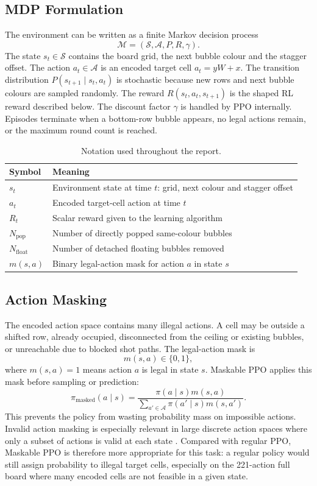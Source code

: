 \documentclass[10pt,a4paper]{article}
\begin{document}
\subsection{MDP Formulation}

The environment can be written as a finite Markov decision process
\[
\mathcal{M}=(\mathcal{S},\mathcal{A},P,R,\gamma).
\]
The state \(s_t\in\mathcal{S}\) contains the board grid, the next bubble colour and the stagger offset. The action \(a_t\in\mathcal{A}\) is an encoded target cell \(a_t=yW+x\). The transition distribution \(P(s_{t+1}\mid s_t,a_t)\) is stochastic because new rows and next bubble colours are sampled randomly. The reward \(R(s_t,a_t,s_{t+1})\) is the shaped RL reward described below. The discount factor \(\gamma\) is handled by PPO internally. Episodes terminate when a bottom-row bubble appears, no legal actions remain, or the maximum round count is reached.

\begin{table}[H]
\centering
\caption{Notation used throughout the report.}
\label{tab:notation}
\small
\begin{tabular}{ll}
\toprule
Symbol & Meaning \\
\midrule
\(s_t\) & Environment state at time \(t\): grid, next colour and stagger offset \\
\(a_t\) & Encoded target-cell action at time \(t\) \\
\(R_t\) & Scalar reward given to the learning algorithm \\
\(N_{\mathrm{pop}}\) & Number of directly popped same-colour bubbles \\
\(N_{\mathrm{float}}\) & Number of detached floating bubbles removed \\
\(m(s,a)\) & Binary legal-action mask for action \(a\) in state \(s\) \\
\bottomrule
\end{tabular}
\end{table}

\subsection{Action Masking}

The encoded action space contains many illegal actions. A cell may be outside a shifted row, already occupied, disconnected from the ceiling or existing bubbles, or unreachable due to blocked shot paths. The legal-action mask is
\[
m(s,a)\in\{0,1\},
\]
where \(m(s,a)=1\) means action \(a\) is legal in state \(s\). Maskable PPO applies this mask before sampling or prediction:
\[
\pi_{\mathrm{masked}}(a\mid s)=
\frac{\pi(a\mid s)m(s,a)}
{\sum_{a'\in\mathcal{A}}\pi(a'\mid s)m(s,a')}.
\]
This prevents the policy from wasting probability mass on impossible actions. Invalid action masking is especially relevant in large discrete action spaces where only a subset of actions is valid at each state \cite{HuangOntanon2020}. Compared with regular PPO, Maskable PPO is therefore more appropriate for this task: a regular policy would still assign probability to illegal target cells, especially on the 221-action full board where many encoded cells are not feasible in a given state.
\end{document}
